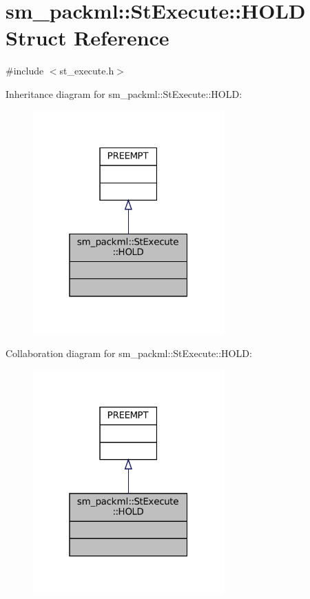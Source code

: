 \hypertarget{structsm__packml_1_1StExecute_1_1HOLD}{}\section{sm\+\_\+packml\+:\+:St\+Execute\+:\+:H\+O\+LD Struct Reference}
\label{structsm__packml_1_1StExecute_1_1HOLD}


{\ttfamily \#include $<$st\+\_\+execute.\+h$>$}



Inheritance diagram for sm\+\_\+packml\+:\+:St\+Execute\+:\+:H\+O\+LD\+:
\nopagebreak
\begin{figure}[H]
\begin{center}
\leavevmode
\includegraphics[width=208pt]{structsm__packml_1_1StExecute_1_1HOLD__inherit__graph}
\end{center}
\end{figure}


Collaboration diagram for sm\+\_\+packml\+:\+:St\+Execute\+:\+:H\+O\+LD\+:
\nopagebreak
\begin{figure}[H]
\begin{center}
\leavevmode
\includegraphics[width=208pt]{structsm__packml_1_1StExecute_1_1HOLD__coll__graph}
\end{center}
\end{figure}


